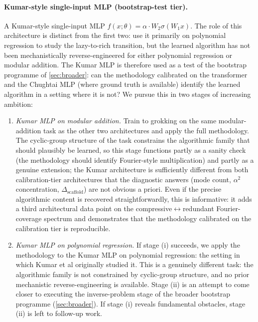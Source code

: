 \documentclass[11pt,a4paper]{article}
\begin{document}
\paragraph{Kumar-style single-input MLP (bootstrap-test tier).} A Kumar-style \citep{kumar2024grokking} single-input MLP $f(x; \theta) = \alpha \cdot W_2 \sigma(W_1 x)$. The role of this architecture is distinct from the first two: \citet{kumar2024grokking} use it primarily on polynomial regression to study the lazy-to-rich transition, but the learned algorithm has not been mechanistically reverse-engineered for either polynomial regression or modular addition. The Kumar MLP is therefore used as a test of the bootstrap programme of \cref{sec:broader}: can the methodology calibrated on the transformer and the Chughtai MLP (where ground truth is available) identify the learned algorithm in a setting where it is not? We pursue this in two stages of increasing ambition:
\begin{enumerate}[label=(\roman*)]
    \item \emph{Kumar MLP on modular addition.} Train to grokking on the same modular-addition task as the other two architectures and apply the full methodology. The cyclic-group structure of the task constrains the algorithmic family that should plausibly be learned, so this stage functions partly as a sanity check (the methodology should identify Fourier-style multiplication) and partly as a genuine extension; the Kumar architecture is sufficiently different from both calibration-tier architectures that the diagnostic answers (mode count, $\alpha^2$ concentration, $\Delta_{\mathrm{scaffold}}$) are not obvious a priori. Even if the precise algorithmic content is recovered straightforwardly, this is informative: it adds a third architectural data point on the compressive$\leftrightarrow$redundant Fourier-coverage spectrum and demonstrates that the methodology calibrated on the calibration tier is reproducible.
    \item \emph{Kumar MLP on polynomial regression.} If stage (i) succeeds, we apply the methodology to the Kumar MLP on polynomial regression: the setting in which Kumar et al originally studied it. This is a genuinely different task: the algorithmic family is not constrained by cyclic-group structure, and no prior mechanistic reverse-engineering is available. Stage (ii) is an attempt to come closer to executing the inverse-problem stage of the broader bootstrap programme (\cref{sec:broader}). If stage (i) reveals fundamental obstacles, stage (ii) is left to follow-up work.
\end{enumerate}
\end{document}
